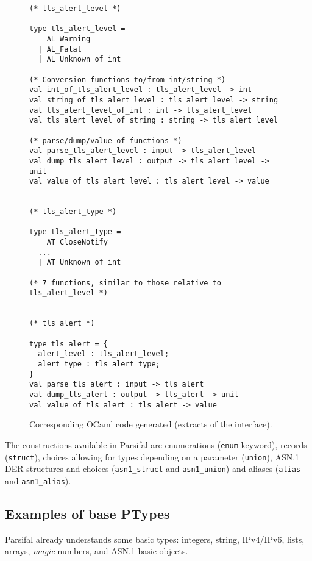 \documentclass{article}
\begin{document}
\begin{figure}[p]
  \begin{center}\begin{minipage}{.65\linewidth}
    \begin{lstlisting}
(* tls_alert_level *)

type tls_alert_level =
    AL_Warning
  | AL_Fatal
  | AL_Unknown of int

(* Conversion functions to/from int/string *)
val int_of_tls_alert_level : tls_alert_level -> int
val string_of_tls_alert_level : tls_alert_level -> string
val tls_alert_level_of_int : int -> tls_alert_level
val tls_alert_level_of_string : string -> tls_alert_level

(* parse/dump/value_of functions *)
val parse_tls_alert_level : input -> tls_alert_level
val dump_tls_alert_level : output -> tls_alert_level -> unit
val value_of_tls_alert_level : tls_alert_level -> value


(* tls_alert_type *)

type tls_alert_type =
    AT_CloseNotify
  ...
  | AT_Unknown of int

(* 7 functions, similar to those relative to tls_alert_level *)


(* tls_alert *)

type tls_alert = {
  alert_level : tls_alert_level;
  alert_type : tls_alert_type;
}
val parse_tls_alert : input -> tls_alert
val dump_tls_alert : output -> tls_alert -> unit
val value_of_tls_alert : tls_alert -> value
    \end{lstlisting}
  \end{minipage}\end{center}
  \caption{Corresponding OCaml code generated (extracts of the interface).}
  \label{fig:tls-generated-code}
\end{figure}


The constructions available in Parsifal are enumerations
(\texttt{enum} keyword), records (\texttt{struct}), choices allowing
for types depending on a parameter (\texttt{union}), ASN.1 DER
structures and choices (\texttt{asn1\_struct} and
\texttt{asn1\_union}) and aliases (\texttt{alias} and
\texttt{asn1\_alias}).


\subsection{Examples of base PTypes}

Parsifal already understands some basic types: integers, string,
IPv4/IPv6, lists, arrays, \emph{magic} numbers, and ASN.1 basic
objects.
\end{document}
